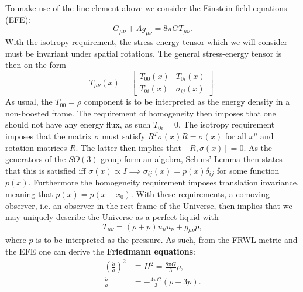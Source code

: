 \documentclass[%
reprint,
 amsmath,amssymb,
 aps,
]{revtex4-2}
\begin{document}
To make use of the line element above we consider the Einstein field equations (EFE):
\begin{equation}
	G_{\mu\nu}+\Lambda g_{\mu\nu}=8\pi G T_{\mu\nu}.\label{eq:EFE}
\end{equation}
With the isotropy requirement, the stress-energy tensor which we will consider must be invariant under spatial rotations. The general stress-energy tensor is then on the form
\[T_{\mu\nu}(x)=\begin{bmatrix}
	T_{00}(x) & T_{0i}(x)\\
	T_{0i}(x) & \sigma_{ij}(x)
\end{bmatrix}.\]
As usual, the $T_{00}=\rho$ component is to be interpreted as the energy density in a non-boosted frame. The requirement of homogeneity then imposes that one should not have any energy flux, as such $T_{0i}=0$. The isotropy requirement imposes that the matrix $\sigma$ must satisfy $R^T\sigma(x) R=\sigma(x)$ for all $x^\mu$ and rotation matrices $R$. The latter then implies that $[R,\sigma(x)]=0$. As the generators of the $SO(3)$ group form an algebra, Schurs' Lemma then states that this is satisfied iff $\sigma(x)\propto I\implies \sigma_{ij}(x)=p(x)\delta_{ij}$ for some function $p(x)$. Furthermore the homogeneity requirement imposes translation invariance, meaning that $p(x)=p(x+x_0)$. With these requirements, a comoving observer, i.e. an observer in the rest frame of the Universe, then implies that we may uniquely describe the Universe as a perfect liquid with
\[T_{\mu\nu}=(\rho+p)u_\mu u_\nu+g_{\mu\nu}p,\]
where $p$ is to be interpreted as the pressure. As such, from the FRWL metric and the EFE one can derive the \textbf{Friedmann equations}:
\begin{align}
	\label{eq:F1}
	\left(\frac{\dot{a}}{a}\right)^2&\equiv H^2=\frac{8\pi G}{3}\rho,\\
	\label{eq:F2}
	\frac{\ddot{a}}{a}&=-\frac{4\pi G}{3}(\rho+3p).
\end{align}
\end{document}
